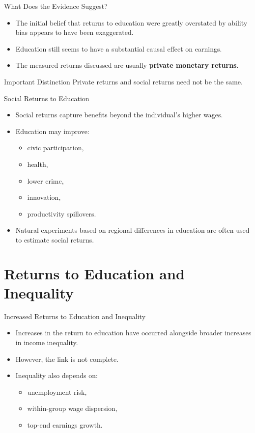 \documentclass[aspectratio=169]{beamer}
\begin{document}
\begin{frame}{What Does the Evidence Suggest?}
\transfade
\begin{itemize}[<+->]
  \item The initial belief that returns to education were greatly overstated by ability bias appears to have been exaggerated.
  \item Education still seems to have a substantial causal effect on earnings.
  \item The measured returns discussed are usually \textbf{private monetary returns}.
\end{itemize}

\begin{block}{Important Distinction}
Private returns and social returns need not be the same.
\end{block}
\end{frame}

\begin{frame}{Social Returns to Education}
\transfade
\begin{itemize}[<+->]
  \item Social returns capture benefits beyond the individual's higher wages.
  \item Education may improve:
  \begin{itemize}[<+->]
    \item civic participation,
    \item health,
    \item lower crime,
    \item innovation,
    \item productivity spillovers.
  \end{itemize}
  \item Natural experiments based on regional differences in education are often used to estimate social returns.
\end{itemize}
\end{frame}

\section{Returns to Education and Inequality}

\begin{frame}{Increased Returns to Education and Inequality}
\transfade
\begin{itemize}[<+->]
  \item Increases in the return to education have occurred alongside broader increases in income inequality.
  \item However, the link is not complete.
  \item Inequality also depends on:
  \begin{itemize}[<+->]
    \item unemployment risk,
    \item within-group wage dispersion,
    \item top-end earnings growth.
  \end{itemize}
\end{itemize}
\end{frame}
\end{document}
